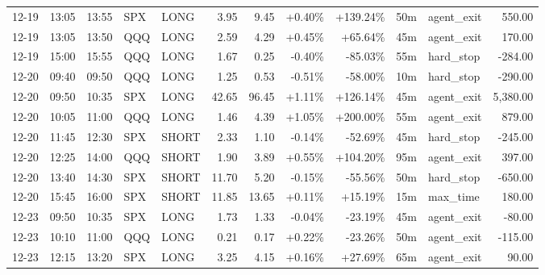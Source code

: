 \documentclass[11pt,a4paper,twoside]{article}
\begin{document}
\begin{center}
\begin{longtable}{>{\color{txtmain}}l l l l l r r r r r >{\color{txtmain}}l r}
12-19 & 13:05 & 13:55 & SPX & LONG & 3.95 & 9.45 & \textcolor{wingreen}{+0.40\%} & \textcolor{wingreen}{+139.24\%} & 50m & agent\_exit & \textcolor{wingreen}{550.00} \\
12-19 & 13:05 & 13:50 & QQQ & LONG & 2.59 & 4.29 & \textcolor{wingreen}{+0.45\%} & \textcolor{wingreen}{+65.64\%} & 45m & agent\_exit & \textcolor{wingreen}{170.00} \\
12-19 & 15:00 & 15:55 & QQQ & LONG & 1.67 & 0.25 & \textcolor{lossred}{-0.40\%} & \textcolor{lossred}{-85.03\%} & 55m & hard\_stop & \textcolor{lossred}{-284.00} \\
12-20 & 09:40 & 09:50 & QQQ & LONG & 1.25 & 0.53 & \textcolor{lossred}{-0.51\%} & \textcolor{lossred}{-58.00\%} & 10m & hard\_stop & \textcolor{lossred}{-290.00} \\
12-20 & 09:50 & 10:35 & SPX & LONG & 42.65 & 96.45 & \textcolor{wingreen}{+1.11\%} & \textcolor{wingreen}{+126.14\%} & 45m & agent\_exit & \textcolor{wingreen}{5,380.00} \\
12-20 & 10:05 & 11:00 & QQQ & LONG & 1.46 & 4.39 & \textcolor{wingreen}{+1.05\%} & \textcolor{wingreen}{+200.00\%} & 55m & agent\_exit & \textcolor{wingreen}{879.00} \\
12-20 & 11:45 & 12:30 & SPX & SHORT & 2.33 & 1.10 & \textcolor{lossred}{-0.14\%} & \textcolor{lossred}{-52.69\%} & 45m & hard\_stop & \textcolor{lossred}{-245.00} \\
12-20 & 12:25 & 14:00 & QQQ & SHORT & 1.90 & 3.89 & \textcolor{wingreen}{+0.55\%} & \textcolor{wingreen}{+104.20\%} & 95m & agent\_exit & \textcolor{wingreen}{397.00} \\
12-20 & 13:40 & 14:30 & SPX & SHORT & 11.70 & 5.20 & \textcolor{lossred}{-0.15\%} & \textcolor{lossred}{-55.56\%} & 50m & hard\_stop & \textcolor{lossred}{-650.00} \\
12-20 & 15:45 & 16:00 & SPX & SHORT & 11.85 & 13.65 & \textcolor{wingreen}{+0.11\%} & \textcolor{wingreen}{+15.19\%} & 15m & max\_time & \textcolor{wingreen}{180.00} \\
12-23 & 09:50 & 10:35 & SPX & LONG & 1.73 & 1.33 & \textcolor{lossred}{-0.04\%} & \textcolor{lossred}{-23.19\%} & 45m & agent\_exit & \textcolor{lossred}{-80.00} \\
12-23 & 10:10 & 11:00 & QQQ & LONG & 0.21 & 0.17 & \textcolor{wingreen}{+0.22\%} & \textcolor{lossred}{-23.26\%} & 50m & agent\_exit & \textcolor{lossred}{-115.00} \\
12-23 & 12:15 & 13:20 & SPX & LONG & 3.25 & 4.15 & \textcolor{wingreen}{+0.16\%} & \textcolor{wingreen}{+27.69\%} & 65m & agent\_exit & \textcolor{wingreen}{90.00} \\

\end{longtable}
\end{center}
\end{document}
